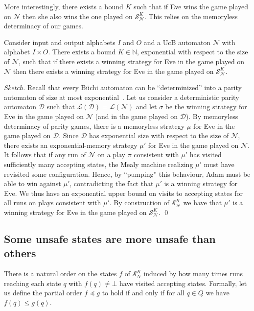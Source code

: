 \documentclass[runningheads,a4paper,draft]{llncs}
\newcommand{\eve}{Eve\xspace}
\newcommand{\adam}{Adam\xspace}
\newcommand{\calN}{\mathcal{N}}
\newcommand{\calS}{\mathcal{S}}
\newcommand{\calD}{\mathcal{D}}
\newcommand{\lang}[1]{\mathcal{L}({#1})}
\begin{document}
More interestingly, there exists a bound $K$ such that if \eve wins
the game played on $\calN$ then she also wins the one played on
$\calS^K_\calN$.  This relies on the memoryless determinacy of our games.
%
\begin{lemma}\label{lem:converse}
    Consider input and output alphabets $I$ and $O$ and a UcB automaton
    $\calN$ with alphabet $I \times O$. There exists a bound $K \in
    \mathbb{N}$, exponential with respect to the size of $\calN$, such that if
    there exists a winning strategy for \eve in the game played on $\calN$
    then there exists a winning strategy for \eve in the game played on
    $\calS^K_\calN$.
\end{lemma}
\begin{proof}[Sketch]
  Recall that every B\"uchi automaton can be ``determinized'' into a parity
  automaton of size at most exponential~\cite{safra88,piterman07}.  Let us
  consider a deterministic parity automaton $\calD$ such that
  $\lang{\calD} = \lang{\calN}$ and let $\sigma$ be the winning strategy for \eve in
  the game played on $\calN$ (and in the game played on $\calD$). By memoryless
  determinacy of parity games, there is a memoryless strategy $\mu$ for \eve in
  the game played on $\calD$. Since $\calD$ has exponential size with respect to
  the size of $\calN$, there exists an exponential-memory strategy $\mu'$ for \eve
  in the game played on $\calN$. It follows that if any run of $\calN$ on a play
  $\pi$ consistent with $\mu'$ has visited sufficiently many accepting states, the
  Mealy machine realizing $\mu'$ must have revisited some configuration. Hence, by
  ``pumping'' this behaviour, \adam must be able to win against $\mu'$,
  contradicting the fact that $\mu'$ is a winning strategy for \eve. We thus have
  an exponential upper bound on visits to accepting states for all runs on plays
  consistent with $\mu'$. By construction of $\calS^K_\calN$ we have that $\mu'$ is
  a winning strategy for \eve in the game played on $\calS^K_\calN$.  \qed
\end{proof}

\subsection{Some unsafe states are more unsafe than others}\label{sec:order}
There is a natural order on the states $f$ of $\calS^K_N$ induced by how many
times runs reaching each state $q$ with $f(q) \neq \bot$ have visited
accepting states. Formally, let us define the partial order $f \preceq g$
to hold if and only if for all $q \in Q$ we have $f(q) \leq g(q)$.
\end{document}
